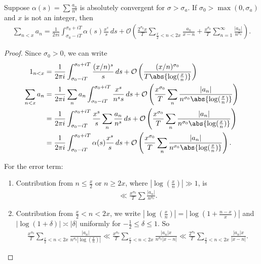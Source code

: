 \documentclass{article}
\newcommand{\1}{\mathbbm{1}}
\newcommand{\bigO}{\mathcal{O}}
\begin{document}
\begin{thm}
  Suppose $\alpha(s) = \sum \frac{a_n}{n^s}$ is absolutely convergent for $\sigma > \sigma_a$.
  If $\sigma_0 > \max(0,\sigma_a)$ and $x$ is not an integer, then
  \begin{align*}
  \sum_{n < x} a_n = \frac{1}{2\pi i} \int_{\sigma_0-iT}^{\sigma_0+iT} \alpha(s) \frac{x^s}{s}\,ds + \bigO\left(\frac{2^{\sigma_0}x}{T} \sum_{\frac{x}{2} < n < 2x} \frac{a_n}{x-n} + \frac{x^{\sigma_0}}{T} \sum_{n=1}^\infty \frac{|a_n|}{n^{\sigma_0}}\right).
  \end{align*}
\end{thm}
\begin{proof}
  Since $\sigma_0 > 0$, we can write
  \begin{align*}
    1_{n<x} &= \frac{1}{2\pi i} \int_{\sigma_0-iT}^{\sigma_0+iT} \frac{(x/n)^s}{s}\,ds + \bigO\left(\frac{(x/n)^{\sigma_0}}{T \abs{\log(\frac{x}{n})}}\right) \\
    \sum_{n < x} a_n &= \frac{1}{2\pi i} \sum_n a_n \int_{\sigma_0-iT}^{\sigma_0+iT} \frac{x^s}{n^s s}\,ds+\bigO\left(\frac{x^{\sigma_0}}{T} \sum_n \frac{|a_n|}{n^{\sigma_0} \abs{\log(\frac{x}{n})}}\right) \\
            &= \frac{1}{2\pi i} \int_{\sigma_0-iT}^{\sigma_0+iT} \frac{x^s}{s} \sum_{n} \frac{a_n}{n^s} \,ds + \bigO\left(\frac{x^{\sigma_0}}{T} \sum_n \frac{|a_n|}{n^{\sigma_0} \abs{\log(\frac{x}{n})}}\right) \\
            &= \frac{1}{2\pi i} \int_{\sigma_0-iT}^{\sigma_0+iT} \alpha(s) \frac{x^s}{s}\,ds + \bigO\left(\frac{x^{\sigma_0}}{T} \sum_n \frac{|a_n|}{n^{\sigma_0} \abs{\log(\frac{x}{n})}}\right).
  \end{align*}

  For the error term:
  \begin{enumerate}
    \item Contribution from $n \leq \frac{x}{2}$ or $n \geq 2x$, where $|\log(\frac{x}{n})| \gg 1$, is
      \begin{align*}
        \ll \frac{x^{\sigma_0}}{T} \sum \frac{|a_n|}{n^{\sigma_0}}.
      \end{align*}
    \item Contribution from $\frac{x}{2} < n < 2x$, we write $|\log(\frac{x}{n})| = |\log(1+\frac{n-x}{x})|$ and $|\log(1+\delta)| \asymp |\delta|$ uniformly for $-\frac{1}{2} \leq \delta \leq 1$. So
      \begin{align*}
        \frac{x^{\sigma_0}}{T} \sum_{\frac{x}{2} < n < 2x} \frac{|a_n|}{n^{\sigma_0} |\log(\frac{x}{n})|} \ll \frac{x^{\sigma_0}}{T} \sum_{\frac{x}{2} < n < 2x} \frac{|a_n| x}{n^{\sigma_0}|x-n|} \ll \frac{2^{\sigma_0}}{T} \sum_{\frac{x}{2} < n < 2x} \frac{|a_n| x}{|x-n|}.
      \end{align*}
  \end{enumerate}
\end{proof}
\end{document}
